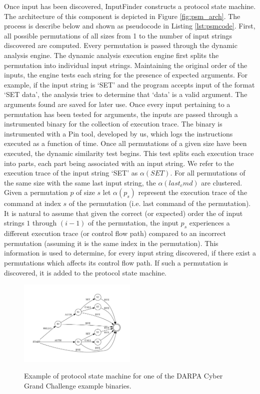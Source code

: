\documentclass{acm_proc_article-sp}
\def \tool {InputFinder}
\begin{document}
Once input has been discovered, \tool{} constructs a protocol state machine.
The architecture of this component is depicted in Figure \ref{fig:psm_arch}.
The process is describe below and shown as pseudocode in Listing \ref{lst:psmcode}.
First, all possible permutations of all sizes from 1 to the number of input strings discovered are computed.
Every permutation is passed through the dynamic analysis engine.
The dynamic analysis execution engine first splits the permutation into individual input strings.
Maintaining the original order of the inputs, the engine tests each string for the presence of expected arguments.
For example, if the input string is `SET' and the program accepts input of the format `SET data', the analysis tries to determine that `data' is a valid argument.
The arguments found are saved for later use.
Once every input pertaining to a permutation has been tested for arguments, the inputs are passed through a instrumented binary for the collection of execution trace.
The binary is instrumented with a Pin tool, developed by us, which logs the instructions executed as a function of time.
Once all permutations of a given size have been executed, the dynamic similarity test begins.
This test splits each execution trace into parts, each part being associated with an input string.
We refer to the execution trace of the input string `SET' as $\alpha(SET)$.
For all permutations of the same size with the same last input string, the $\alpha(last_cmd)$ are clustered.
Given a permutation $p$ of size $s$ let $\alpha(p_s)$ represent the execution trace of the command at index $s$ of the permutation (i.e. last command of the permutation).
It is natural to assume that given the correct (or expected) order the of input strings $1$ through $(i-1)$ of the permutation, the input $p_s$ experiences a different execution trace (or control flow path) compared to an incorrect permutation (assuming it is the same index in the permutation).
This information is used to determine, for every input string discovered, if there exist a permutations which affects its control flow path.
If such a permutation is discovered, it is added to the protocol state machine.

\begin{figure}[h!]
\caption{Example of protocol state machine for one of the DARPA Cyber Grand Challenge example binaries.}
\centering
\includegraphics[width=0.5\textwidth]{protocoldiagram}
\label{fig:psm_example}
\end{figure}
\end{document}
